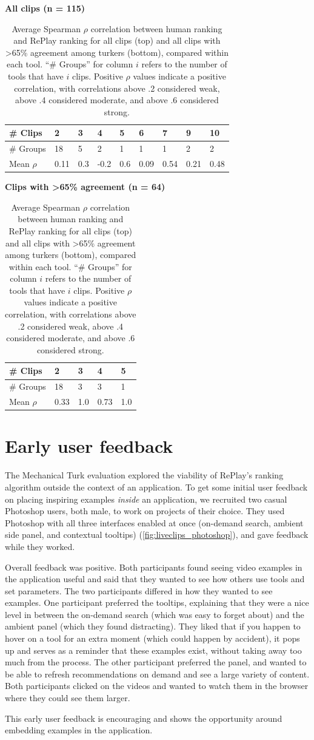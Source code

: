\begin{table}[b!]
\small
\centering
\textbf{All clips (n = 115)}
\vspace{5pt}
\begin{tabular}{l|llllllll}
\# Clips & 2    & 3 & 4 & 5   & 6    & 7    & 9    & 10   \\ \hline
\# Groups           & 18   & 5 & 2 & 1   & 1    & 1    & 2    & 2    \\
Mean $\rho$  & 0.11 & 0.3 & -0.2 & 0.6 & 0.09 & 0.54 & 0.21 & 0.48
\end{tabular}
\textbf{Clips with >65\% agreement (n = 64)}
\begin{tabular}{l|llll}
\# Clips & 2    & 3   & 4    & 5   \\ \hline
\# Groups           & 18   & 3   & 3    & 1   \\
Mean $\rho$  & 0.33 & 1.0 & 0.73 & 1.0
\end{tabular}
\caption{Average Spearman $\rho$ correlation between human ranking and RePlay ranking for all clips (top) and all clips with >65\% agreement among turkers (bottom), compared within each tool. ``\# Groups'' for column $i$ refers to the number of tools that have $i$ clips. Positive $\rho$ values indicate a positive correlation, with correlations above .2 considered weak, above .4 considered moderate, and above .6 considered strong.}
\label{table:agreement}
\end{table}

\section{Early user feedback}
The Mechanical Turk evaluation explored the viability of RePlay's ranking algorithm outside the context of an application. To get some initial user feedback on placing inspiring examples \textit{inside} an application, we recruited two casual Photoshop users, both male, to work on projects of their choice. They used Photoshop with all three interfaces enabled at once (on-demand search, ambient side panel, and contextual tooltips) (\autoref{fig:liveclips_photoshop}), and gave feedback while they worked.

Overall feedback was positive. Both participants found seeing video examples in the application useful and said that they wanted to see how others use tools and set parameters. The two participants differed in how they wanted to see examples. One participant preferred the tooltips, explaining that they were a nice level in between the on-demand search (which was easy to forget about) and the ambient panel (which they found distracting). They liked that if you happen to hover on a tool for an extra moment (which could happen by accident), it pops up and serves as a reminder that these examples exist, without taking away too much from the process. The other participant preferred the panel, and wanted to be able to refresh recommendations on demand and see a large variety of content. Both participants clicked on the videos and wanted to watch them in the browser where they could see them larger. 

This early user feedback is encouraging and shows the opportunity around embedding examples in the application.

